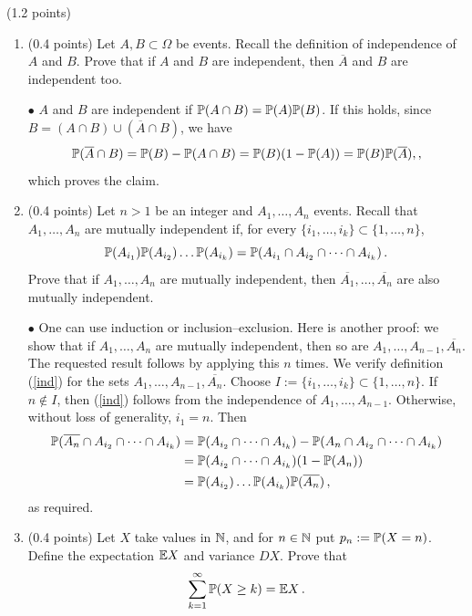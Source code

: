 \documentclass[a4paper]{report}
\begin{document}
\begin{problem}(1.2 points)
\begin{enumerate}
    \item (0.4 points) Let $A,B\subset\Omega$ be events. Recall the definition of
    independence of $A$ and $B$. Prove that if $A$ and $B$ are independent, then $\overline A$ and
    $B$ are independent too.

    $\bullet$ $A$ and $B$ are independent if $\P(A\cap B)=\P(A)\P(B)$. If this holds,
    since\\ $B=(A\cap B)\cup(\overline A\cap B)$, we have
    \[
    \P(\overline{A}\cap B) = \P(B) - \P(A \cap B) = \P(B)(1-\P(A)) = \P(B)\P(\overline{A}),,
    \]
    which proves the claim.
    \item (0.4 points) Let $n>1$ be an integer and $A_1,\dots,A_n$ events. Recall that $A_1,\dots,A_n$
    are mutually independent if, for every $\{i_1,\dots,i_k\}\subset\{1,\dots,n\}$,
    \begin{equation}\label{ind}
    \P(A_{i_1})\P(A_{i_2}) \dots \P(A_{i_k}) = \P(A_{i_1} \cap A_{i_2} \cap \dots \cap A_{i_k})
    \, .
    \end{equation}Prove that if $A_1,\dots,A_n$ are mutually independent,
    then $\overline{A_1},\dots,\overline{A_n}$ are also mutually independent.

    $\bullet$ One can use induction or inclusion--exclusion.
    Here is another proof: we show that if
    $A_1,\dots,A_n$ are mutually independent,
    then so are $A_1,\dots,A_{n-1},\overline{A_n}$. The requested
    result
    follows by applying this $n$ times. We verify definition (\ref{ind}) for
    the sets $A_1,\dots,A_{n-1},
    \overline{A_n}$. Choose $I:=\{i_1,\dots,i_k\}\subset\{1,\dots,n\}$. If $n\notin I$, then (\ref{ind}) follows from the independence of
    $A_1,\dots,A_{n-1}$. Otherwise, without loss of generality, $i_1=n$. Then
    \begin{align*}
     \P(\overline{A_n} \cap A_{i_2} \cap \dots \cap A_{i_k})
     &=\P(A_{i_2} \cap \dots \cap A_{i_k}) - \P(A_n \cap A_{i_2} \cap \dots \cap A_{i_k})\\
    &=\P(A_{i_2} \cap \dots \cap A_{i_k})(1 -  \P(A_n))\\
    &= \P(A_{i_2}) \dots \P(A_{i_k})\P(\overline{A_n})\, ,
     \end{align*}
    as required.
    \item (0.4 points) Let $X$ take values in $\N$, and for $n\in\N$ put
    $p_n:=\P(X=n)$. Define the expectation $\E X$ and variance $D X$. Prove that
    \begin{equation}\label{last}
    \sum_{k = 1}^\infty \P(X \geq k) = \E X \, .
    \end{equation}
\end{enumerate}


\end{problem}
\end{document}
